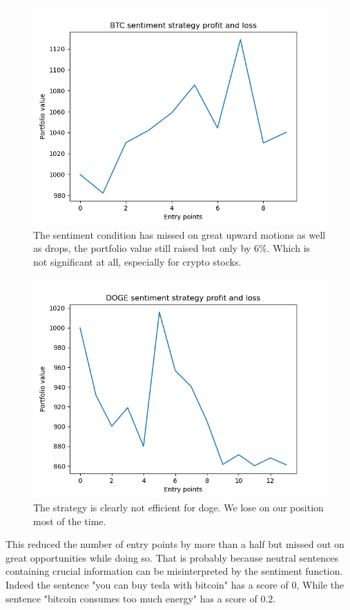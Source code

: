 \documentclass[twoside]{report}
\begin{document}
\begin{spacing}{1}
\begin{figure}[!htbp]
    \includegraphics[scale = 0.5]{TestPlots/plot_sentiment_btc.png}
    \caption{The sentiment condition has missed on great upward motions as well as drops, the portfolio value still raised but only by 6\%. Which is not significant at all, especially for crypto stocks.}
    \label{}
\end{figure}
\begin{figure}[!htbp]
    \centering
    \includegraphics[scale = 0.5]{TestPlots/Doge_sentiment_plot.png}
    \caption{The strategy is clearly not efficient for doge. We lose on our position most of the time. }
    \label{}
\end{figure}

This  reduced the number of entry points by more than a half but missed out on great opportunities while doing so. That is probably because neutral sentences containing crucial information can be misinterpreted by the sentiment function. Indeed the sentence "you can buy tesla with bitcoin" has a score of $0$, While the sentence "bitcoin consumes too much energy" has a score of $0.2$.


\end{spacing}
\end{document}
